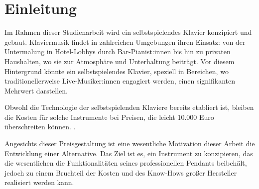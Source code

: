 
\chapter{Einleitung} \label{einleitung}

\nocite{*}

Im Rahmen dieser Studienarbeit wird ein selbstspielendes Klavier konzipiert und gebaut.
Klaviermusik findet in zahlreichen Umgebungen ihren Einsatz: von der Untermalung in Hotel-Lobbys durch Bar-Pianist:innen bis hin zu privaten Haushalten,
wo sie zur Atmosphäre und Unterhaltung beiträgt.
Vor diesem Hintergrund könnte ein selbstspielendes Klavier, speziell in Bereichen, wo traditionellerweise Live-Musiker:innen engagiert werden,
einen signifikanten Mehrwert darstellen.

Obwohl die Technologie der selbstspielenden Klaviere bereits etabliert ist, bleiben die Kosten für solche Instrumente bei Preisen,
die leicht 10.000 Euro überschreiten können. \cite{YamahaU1}.


Angesichts dieser Preisgestaltung ist eine wesentliche Motivation dieser Arbeit die Entwicklung einer Alternative.
Das Ziel ist es, ein Instrument zu konzipieren, das die wesentlichen die Funktionalitäten seines professionellen Pendants beibehält,
jedoch zu einem Bruchteil der Kosten und des Know-Hows großer Hersteller realisiert werden kann.


